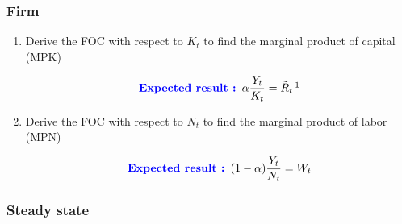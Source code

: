 \documentclass{article}
\begin{document}
\subsubsection{Firm}
\begin{enumerate}
    \item Derive the FOC with respect to $K_t$ to find the marginal product of capital (MPK)
    \begin{expectedresultsbox}
    \begin{equation}
        \textcolor{blue}{\textbf{Expected result : }} \alpha\frac{Y_t}{K_t} = \tilde{R}_t \,\footnotemark
    \end{equation}
    \end{expectedresultsbox}
    \item Derive the FOC with respect to $N_t$ to find the marginal product of labor (MPN) 
    \begin{expectedresultsbox}
    \begin{equation}
        \textcolor{blue}{\textbf{Expected result : }} (1-\alpha)\frac{Y_t}{N_t} = W_t 
    \end{equation}
    \end{expectedresultsbox}   
\end{enumerate}



\subsubsection{Steady state}
\end{document}

